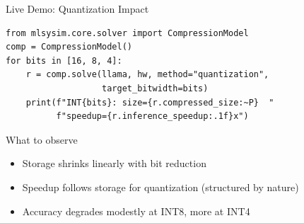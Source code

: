 \documentclass[aspectratio=169, 12pt]{beamer}
\begin{document}
\begin{frame}[fragile]{Live Demo: Quantization Impact}

\small
\begin{lstlisting}
from mlsysim.core.solver import CompressionModel
comp = CompressionModel()
for bits in [16, 8, 4]:
    r = comp.solve(llama, hw, method="quantization",
                   target_bitwidth=bits)
    print(f"INT{bits}: size={r.compressed_size:~P}  "
          f"speedup={r.inference_speedup:.1f}x")
\end{lstlisting}

\vspace{0.2cm}
\begin{exampleblock}{What to observe}
  \begin{itemize}
    \item Storage shrinks linearly with bit reduction
    \item Speedup follows storage for quantization (structured by nature)
    \item Accuracy degrades modestly at INT8, more at INT4
  \end{itemize}
\end{exampleblock}
\end{frame}
\end{document}
